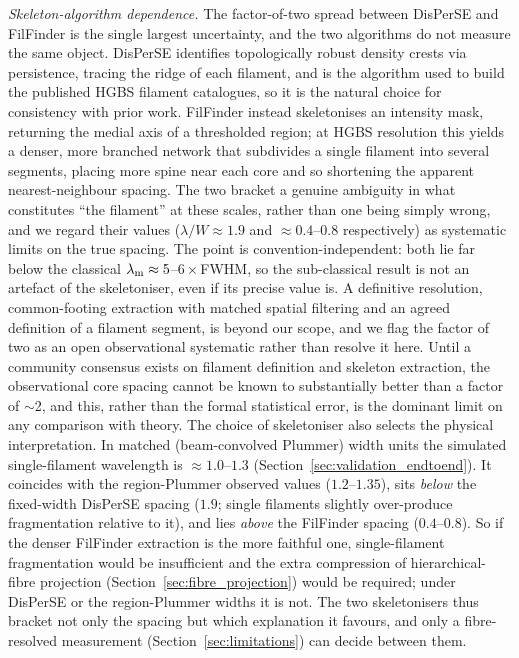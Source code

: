 \documentclass[usenatbib,twoside,twocolumn]{mnras}
\begin{document}
\emph{Skeleton-algorithm dependence.} The factor-of-two spread between DisPerSE and FilFinder is the single largest uncertainty, and the two algorithms do not measure the same object. DisPerSE identifies topologically robust density crests via persistence, tracing the ridge of each filament, and is the algorithm used to build the published HGBS filament catalogues, so it is the natural choice for consistency with prior work. FilFinder instead skeletonises an intensity mask, returning the medial axis of a thresholded region; at HGBS resolution this yields a denser, more branched network that subdivides a single filament into several segments, placing more spine near each core and so shortening the apparent nearest-neighbour spacing. The two bracket a genuine ambiguity in what constitutes ``the filament'' at these scales, rather than one being simply wrong, and we regard their values ($\lambda/W\approx1.9$ and $\approx0.4$--$0.8$ respectively) as systematic limits on the true spacing. The point is convention-independent: both lie far below the classical $\lambda_{\rm m}\approx5$--$6\times$FWHM, so the sub-classical result is not an artefact of the skeletoniser, even if its precise value is. A definitive resolution, common-footing extraction with matched spatial filtering and an agreed definition of a filament segment, is beyond our scope, and we flag the factor of two as an open observational systematic rather than resolve it here. Until a community consensus exists on filament definition and skeleton extraction, the observational core spacing cannot be known to substantially better than a factor of $\sim$2, and this, rather than the formal statistical error, is the dominant limit on any comparison with theory. The choice of skeletoniser also selects the physical interpretation. In matched (beam-convolved Plummer) width units the simulated single-filament wavelength is $\approx1.0$--$1.3$ (Section~\ref{sec:validation_endtoend}). It coincides with the region-Plummer observed values ($1.2$--$1.35$), sits \emph{below} the fixed-width DisPerSE spacing ($1.9$; single filaments slightly over-produce fragmentation relative to it), and lies \emph{above} the FilFinder spacing ($0.4$--$0.8$). So if the denser FilFinder extraction is the more faithful one, single-filament fragmentation would be insufficient and the extra compression of hierarchical-fibre projection (Section~\ref{sec:fibre_projection}) would be required; under DisPerSE or the region-Plummer widths it is not. The two skeletonisers thus bracket not only the spacing but which explanation it favours, and only a fibre-resolved measurement (Section~\ref{sec:limitations}) can decide between them.
\end{document}
